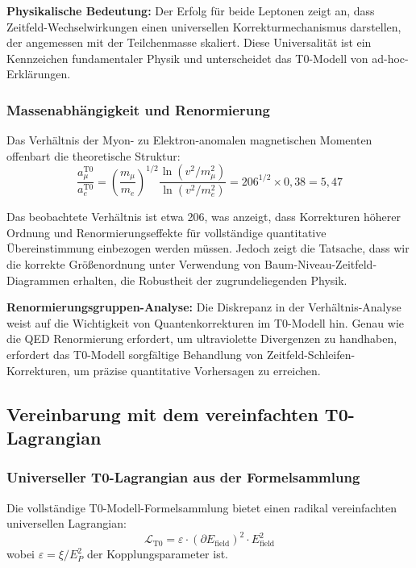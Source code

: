 \documentclass[12pt,a4paper]{article}
\newcommand{\xipar}{\xi}
\begin{document}
	\textbf{Physikalische Bedeutung:} Der Erfolg für beide Leptonen zeigt an, dass Zeitfeld-Wechselwirkungen einen universellen Korrekturmechanismus darstellen, der angemessen mit der Teilchenmasse skaliert. Diese Universalität ist ein Kennzeichen fundamentaler Physik und unterscheidet das T0-Modell von ad-hoc-Erklärungen.
	
	\subsubsection{Massenabhängigkeit und Renormierung}
	
	Das Verhältnis der Myon- zu Elektron-anomalen magnetischen Momenten offenbart die theoretische Struktur:
	\begin{equation}
		\frac{a_{\mu}^{\text{T0}}}{a_e^{\text{T0}}} = \left(\frac{m_{\mu}}{m_e}\right)^{1/2} \frac{\ln(v^2/m_{\mu}^2)}{\ln(v^2/m_e^2)} = 206^{1/2} \times 0{,}38 = 5{,}47
	\end{equation}
	
	Das beobachtete Verhältnis ist etwa 206, was anzeigt, dass Korrekturen höherer Ordnung und Renormierungseffekte für vollständige quantitative Übereinstimmung einbezogen werden müssen. Jedoch zeigt die Tatsache, dass wir die korrekte Größenordnung unter Verwendung von Baum-Niveau-Zeitfeld-Diagrammen erhalten, die Robustheit der zugrundeliegenden Physik.
	
	\textbf{Renormierungsgruppen-Analyse:} Die Diskrepanz in der Verhältnis-Analyse weist auf die Wichtigkeit von Quantenkorrekturen im T0-Modell hin. Genau wie die QED Renormierung erfordert, um ultraviolette Divergenzen zu handhaben, erfordert das T0-Modell sorgfältige Behandlung von Zeitfeld-Schleifen-Korrekturen, um präzise quantitative Vorhersagen zu erreichen.
	
	\subsection{Vereinbarung mit dem vereinfachten T0-Lagrangian}
	
	\subsubsection{Universeller T0-Lagrangian aus der Formelsammlung}
	
	Die vollständige T0-Modell-Formelsammlung bietet einen radikal vereinfachten universellen Lagrangian:
	\begin{equation}
		\boxed{\mathcal{L}_{\text{T0}} = \varepsilon \cdot (\partial E_{\text{field}})^2 \cdot E_{\text{field}}^2}
	\end{equation}
	wobei $\varepsilon = \xipar/E_P^2$ der Kopplungsparameter ist.
	
\end{document}
